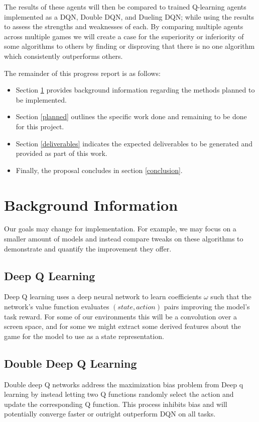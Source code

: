 \documentclass[conference]{IEEEtran}
\begin{document}
The results of these agents will then be compared to trained Q-learning agents implemented as a DQN, Double DQN, and Dueling DQN; while using the results to assess the strengths and weaknesses of each. By comparing multiple agents across multiple games we will create a case for the superiority or inferiority of some algorithms to others by finding or disproving that there is no one algorithm which consistently outperforms others.

The remainder of this progress report is as follows:
\begin{itemize}
\item Section \ref{background} provides background information regarding the methods planned to be implemented.
\item Section \ref{planned} outlines the specific work done and remaining to be done for this project.
\item Section \ref{deliverables} indicates the expected deliverables to be generated and provided as part of this work.
\item Finally, the proposal concludes in section \ref{conclusion}.
\end{itemize}

\section{Background Information} \label{background}
Our goals may change for implementation. For example, we may focus on a smaller amount of models and instead compare tweaks on these algorithms to demonstrate and quantify the improvement they offer.
\subsection{Deep Q Learning}
Deep Q learning uses a deep neural network to learn coefficients $\omega$ such that the network's value function evaluates $(state, action)$ pairs improving the model's task reward. For some of our environments this will be a convolution over a screen space, and for some we might extract some derived features about the game for the model to use as a state representation.

\subsection{Double Deep Q Learning}
Double deep Q networks address the maximization bias problem from Deep q learning by instead letting two Q functions randomly select the action and update the corresponding Q function. This process inhibits bias and will potentially converge faster or outright outperform DQN on all tasks.
\end{document}
